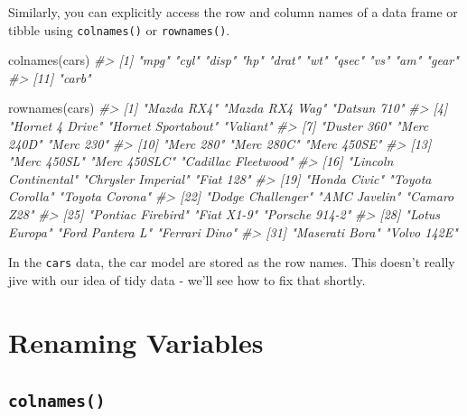 \documentclass[
  12pt,
]{book}
\newenvironment{Shaded}{\begin{snugshade}}{\end{snugshade}}
\newcommand{\CommentTok}[1]{\textcolor[rgb]{0.56,0.35,0.01}{\textit{#1}}}
\newcommand{\FunctionTok}[1]{\textcolor[rgb]{0.00,0.00,0.00}{#1}}
\newcommand{\NormalTok}[1]{#1}
\begin{document}
Similarly, you can explicitly access the row and column names of a data frame or tibble using \texttt{colnames()} or \texttt{rownames()}.

\begin{Shaded}
\begin{Highlighting}[]
\FunctionTok{colnames}\NormalTok{(cars)}
\CommentTok{\#\textgreater{}  [1] "mpg"  "cyl"  "disp" "hp"   "drat" "wt"   "qsec" "vs"   "am"   "gear"}
\CommentTok{\#\textgreater{} [11] "carb"}
\end{Highlighting}
\end{Shaded}

\begin{Shaded}
\begin{Highlighting}[]
\FunctionTok{rownames}\NormalTok{(cars)}
\CommentTok{\#\textgreater{}  [1] "Mazda RX4"           "Mazda RX4 Wag"       "Datsun 710"         }
\CommentTok{\#\textgreater{}  [4] "Hornet 4 Drive"      "Hornet Sportabout"   "Valiant"            }
\CommentTok{\#\textgreater{}  [7] "Duster 360"          "Merc 240D"           "Merc 230"           }
\CommentTok{\#\textgreater{} [10] "Merc 280"            "Merc 280C"           "Merc 450SE"         }
\CommentTok{\#\textgreater{} [13] "Merc 450SL"          "Merc 450SLC"         "Cadillac Fleetwood" }
\CommentTok{\#\textgreater{} [16] "Lincoln Continental" "Chrysler Imperial"   "Fiat 128"           }
\CommentTok{\#\textgreater{} [19] "Honda Civic"         "Toyota Corolla"      "Toyota Corona"      }
\CommentTok{\#\textgreater{} [22] "Dodge Challenger"    "AMC Javelin"         "Camaro Z28"         }
\CommentTok{\#\textgreater{} [25] "Pontiac Firebird"    "Fiat X1{-}9"           "Porsche 914{-}2"      }
\CommentTok{\#\textgreater{} [28] "Lotus Europa"        "Ford Pantera L"      "Ferrari Dino"       }
\CommentTok{\#\textgreater{} [31] "Maserati Bora"       "Volvo 142E"}
\end{Highlighting}
\end{Shaded}

In the \texttt{cars} data, the car model are stored as the row names. This doesn't really jive with our idea of tidy data - we'll see how to fix that shortly.

\hypertarget{renaming-variables}{%
\section{Renaming Variables}\label{renaming-variables}}

\hypertarget{colnames}{%
\subsection{\texorpdfstring{\texttt{colnames()}}{colnames()}}\label{colnames}}
\end{document}
